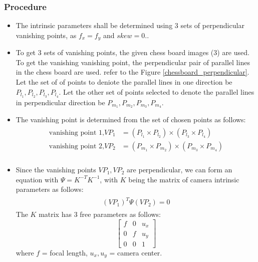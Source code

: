 \documentclass[fleqn]{article}
\begin{document}
\subsubsection{Procedure}
\begin{itemize}

  \item The intrinsic parameters shall be determined using 3 sets of perpendicular vanishing points, as $f_x = f_y$ and $skew = 0$..
  \item To get 3 sets of vanishing points, the given chess board images (3) are used. To get the vanishing vanishing point, the perpendicular
  pair of parallel lines in the chess board are used. refer to the Figure \ref{chessboard_perpendicular}.  Let the set of of points to deniote
  the parallel lines in one direction be $P_{l_1}, P_{l_2}, P_{l_3}, P_{l_4}$. Let the other set of points selected to denote the parallel lines in
  perpendicular direction be $P_{m_1}, P_{m_2}, P_{m_3}, P_{m_4}$.
  \item The vanishing point is determined from the set of chosen points as follows:
  \begin{eqnarray*}
  \begin{aligned}
  \text{vanishing point 1,} VP_1 &= (P_{l_1} \times P_{l_2}) \times (P_{l_3} \times P_{l_4})\\
  \text{vanishing point 2,} VP_2 &= (P_{m_1} \times P_{m_2}) \times (P_{m_3} \times P_{m_4})\\
  \end{aligned}
  \end{eqnarray*} 
  
 \item Since the vanishing points $VP_1, VP_2$ are perpendicular, we can form an equation with $\Psi = K^{-T}K^{-1}$, with $K$ being the matrix of
 camera intrinsic parameters as follows:
  \begin{eqnarray*}
  \begin{aligned}
  (VP_1)^T \Psi (VP_2) = 0
  \end{aligned}
  \end{eqnarray*}
  The $K$ matrix has 3 free parameters as follows:
  \[
   \begin{bmatrix}
   		f & 0 & u_x \\
   		0 & f & u_y \\
   		0 & 0 & 1
   \end{bmatrix}
  \]
  where  $f$ = focal length, $u_x, u_y$ = camera center.
  

\end{itemize}
\end{document}
